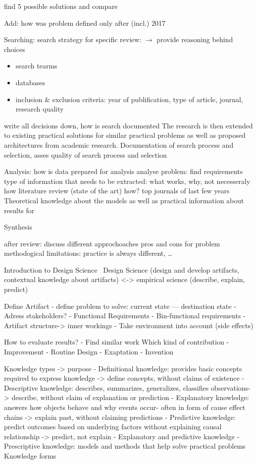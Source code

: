 

find 5 possible solutions and compare

Add: how was problem defined
only after (incl.) 2017

Searching:
search strategy for specific review: $\rightarrow$ provide reasoning behind choices
\begin{itemize}
    \item search tearms
    \item databases
    \item inclusion \& exclusion criteria: year of publification, type of article, journal, research
        quality
\end{itemize}
write all decisions down, how is search documented
The research is then extended to existing practical solutions for similar practical problems as
well as proposed architectures from academic research.
Documentation of search process and selection, asses quality of search process and selection

Analysis:
how is data prepared for analysis
analyse problem: find requirements
type of information that needs to be extracted: what works, why, not necesseraly how
literature review (state of the art)
how? top journals of last few years
Theoretical knowledge about the models as well as practical information about results for

Synthesis

after review:
discuss different approchoaches pros and cons for problem
methodogical limitations: practice is always different, \ldots


Introduction to Design Science~\citep{johannesson_introduction_2021}
Design Science (design and develop artifacts, contextual knowledge about artifacts) <-> empirical science (describe, explain, predict)

Define Artifact
- define problem to solve: current state --- destination  state
- Adress stakeholders?
- Functional Requirements
- Bin-functional requirements
- Artifact structure-> inner workings
- Take environment into account (side effects)

How to evaluate results?
- Find similar work
Which kind of contribution
- Improvement
- Routine Design
- Exaptation
- Invention

Knowledge types -> purpose
- Definitional knowledge: provides basic concepts required to express knowledge -> define concepts, without claims of existence
- Descriptive knowledge: describes, summarizes, generalizes, classifies observations-> describe, without claim of explanation or prediction
- Explanatory knowledge: answers how objects behave and why events occur- often in form of cause effect chains -> explain past, without claiming predictions
- Predictive knowledge: predict outcomes based on underlying factors without explaining causal relationship -> predict, not explain
- Explanatory and predictive knowledge
- Prescriptive knowledge: models and methods that help solve practical problems
Knowledge forms

